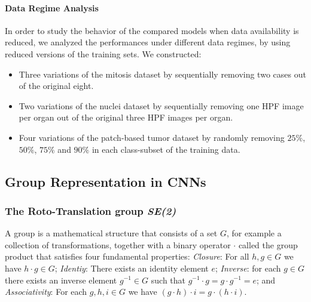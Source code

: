 \documentclass[twocolumn,final]{article}
\newcommand{\se}[1]{\textit{SE(#1)}}
\begin{document}
\paragraph{Data Regime Analysis}
In order to study the behavior of the compared models when data availability is reduced, we analyzed the performances under different data regimes, by using reduced versions of the training sets.
We constructed:
\begin{itemize}
\setlength\itemsep{-0.5em}
\item Three variations of the mitosis dataset by sequentially removing two cases out of the original eight. 
\item Two variations of the nuclei dataset by sequentially removing one HPF image per organ out of the original three HPF images per organ.
\item Four variations of the patch-based tumor dataset by randomly removing $25\%$, $50\%$, $75\%$ and $90\%$ in each class-subset of the training data.
\end{itemize}


\subsection{Group Representation in CNNs}
\label{gCNNrepresentation}
\subsubsection{The Roto-Translation group \se{2}}
A group is a mathematical structure that consists of a set $G$, for example a collection of transformations, together with a binary operator $\cdot$ called the group product that satisfies four fundamental properties: \textit{Closure}: For all $h,g \in G$ we have $h\cdot g \in G$; \textit{Identiy}: There exists an identity element $e$; \textit{Inverse}: for each $g \in G$ there exists an inverse element $g^{-1} \in G$ such that $g^{-1} \cdot g = g \cdot g^{-1} = e$; and \textit{Associativity}: For each $g,h,i \in G$ we have $ (g \cdot h) \cdot i = g \cdot (h \cdot i)$. 
\end{document}
